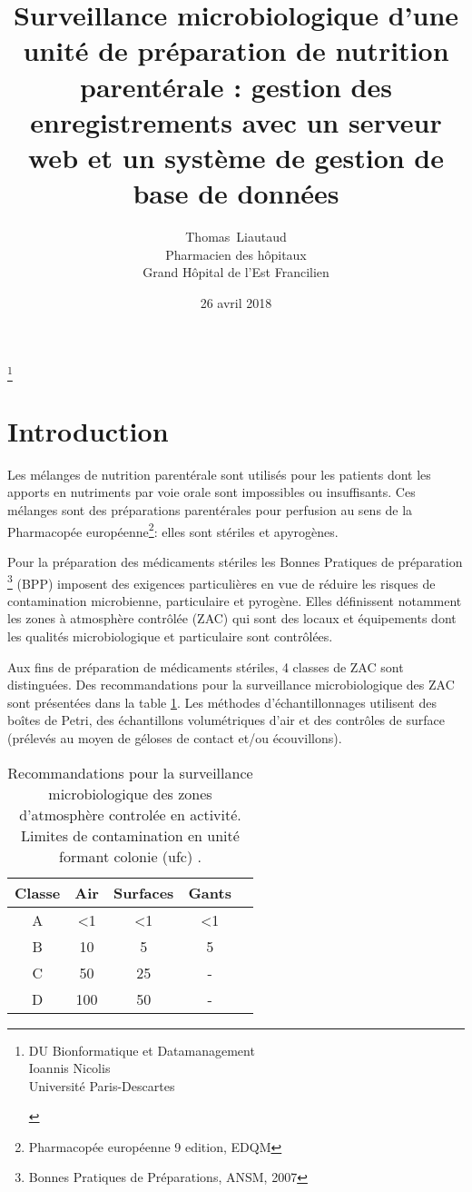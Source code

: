 \documentclass[12pt,a4paper,oneside]{article}
\author{Thomas~Liautaud\\Pharmacien des hôpitaux\\Grand Hôpital de l'Est Francilien}
\date{26 avril 2018}
\title{Surveillance microbiologique d'une unité de préparation de nutrition parentérale : gestion des enregistrements avec un serveur web et un système de gestion de base de données}
\begin{document}
\maketitle
\thanks{\begin{center}
DU Bionformatique et Datamanagement\\ Ioannis Nicolis\\Université Paris-Descartes
\end{center}}
\tableofcontents
\section{Introduction}
Les mélanges de nutrition parentérale sont utilisés pour les patients dont les apports en nutriments par voie orale sont impossibles ou insuffisants. Ces mélanges sont des préparations parentérales pour perfusion au sens de la Pharmacopée européenne\footnote{Pharmacopée européenne 9 edition, EDQM}: elles sont stériles et apyrogènes.

Pour la préparation des médicaments stériles les Bonnes Pratiques de préparation \footnote{Bonnes Pratiques de Préparations, ANSM, 2007} (BPP) imposent des  exigences  particulières en vue de réduire les risques de contamination microbienne, particulaire et pyrogène. Elles définissent notamment les zones à atmosphère contrôlée (ZAC) qui sont des locaux et équipements dont les qualités microbiologique et particulaire sont contrôlées.

Aux fins de préparation de médicaments stériles, 4 classes de ZAC sont distinguées. Des recommandations pour la surveillance microbiologique des ZAC sont présentées dans la table \ref{classes}. Les méthodes d'échantillonnages utilisent des boîtes de Petri, des échantillons volumétriques d'air et des contrôles de surface (prélevés au moyen de géloses de contact et/ou écouvillons).
\begin{table}[h]
\caption{Recommandations pour la surveillance microbiologique des zones d'atmosphère controlée en activité. Limites de contamination en unité formant colonie (ufc) .\label{classes}}
\begin{center}
\begin{tabular}{|c|c|c|c|c|}
	\hline
	\textbf{Classe} & \textbf{Air} &\textbf{Surfaces} & \textbf{Gants}\\
	\hline
	A & <1 & <1 & <1\\
	B & 10 & 5 & 5\\
	C & 50 & 25 & -\\
	D & 100 & 50 & -\\
	
	\hline
\end{tabular}
\end{center}
\end{table}
\end{document}
